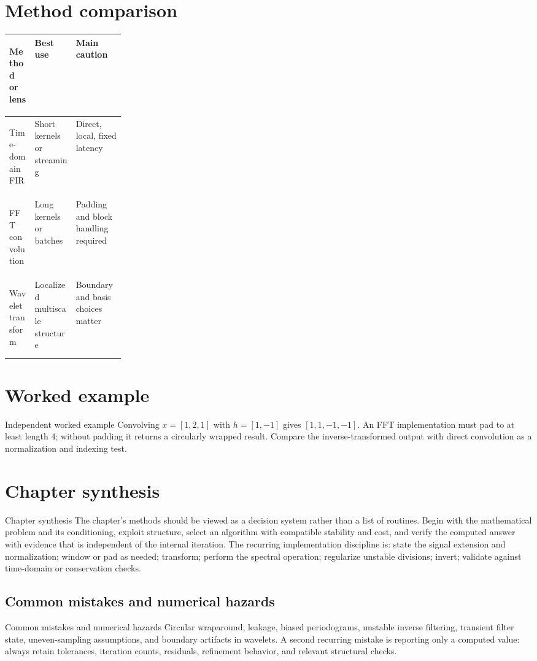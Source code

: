 \documentclass[10pt,letterpaper]{article}
\begin{document}
\section*{Method comparison}
\begin{center}
\small
\begin{tabularx}{\linewidth}{>{\bfseries\raggedright\arraybackslash}p{0.22\linewidth}XX}
\toprule
Method or lens & Best use & Main caution \\
\midrule
Time-domain FIR & Short kernels or streaming & Direct, local, fixed latency \\
FFT convolution & Long kernels or batches & Padding and block handling required \\
Wavelet transform & Localized multiscale structure & Boundary and basis choices matter \\
\bottomrule
\end{tabularx}
\end{center}

\section*{Worked example}
\begin{exambox}{Independent worked example}
Convolving $x=[1,2,1]$ with $h=[1,-1]$ gives $[1,1,-1,-1]$.  An FFT implementation must pad to at least length $4$; without padding it returns a circularly wrapped result.  Compare the inverse-transformed output with direct convolution as a normalization and indexing test.
\end{exambox}

\section*{Chapter synthesis}
\begin{summarybox}{Chapter synthesis}
The chapter's methods should be viewed as a decision system rather than a list of routines.  Begin with the mathematical problem and its conditioning, exploit structure, select an algorithm with compatible stability and cost, and verify the computed answer with evidence that is independent of the internal iteration.  The recurring implementation discipline is: state the signal extension and normalization; window or pad as needed; transform; perform the spectral operation; regularize unstable divisions; invert; validate against time-domain or conservation checks.
\end{summarybox}

\subsection*{Common mistakes and numerical hazards}
\begin{warnbox}{Common mistakes and numerical hazards}
Circular wraparound, leakage, biased periodograms, unstable inverse filtering, transient filter state, uneven-sampling assumptions, and boundary artifacts in wavelets.  A second recurring mistake is reporting only a computed value: always retain tolerances, iteration counts, residuals, refinement behavior, and relevant structural checks.
\end{warnbox}
\end{document}
